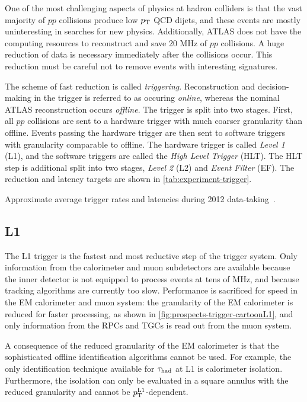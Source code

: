 One of the most challenging aspects of physics at hadron colliders is that the vast majority of $pp$ collisions produce low $p_{\mathrm{T}}$ QCD dijets, and these events are mostly uninteresting in searches for new physics. Additionally, ATLAS does not have the computing resources to reconstruct and save 20 MHz of $pp$ collisions. A huge reduction of data is necessary immediately after the collisions occur. This reduction must be careful not to remove events with interesting signatures.

The scheme of fast reduction is called \textit{triggering}. Reconstruction and decision-making in the trigger is referred to as occuring \textit{online}, whereas the nominal ATLAS reconstruction occurs \textit{offline}. The trigger is split into two stages. First, all $pp$ collisions are sent to a hardware trigger with much coarser granularity than offline. Events passing the hardware trigger are then sent to software triggers with granularity comparable to offline. The hardware trigger is called \textit{Level 1} (L1), and the software triggers are called the \textit{High Level Trigger} (HLT). The HLT step is additional split into two stages, \textit{Level 2} (L2) and \textit{Event Filter} (EF). The reduction and latency targets are shown in \cref{tab:experiment-trigger}.

\begin{table}[bp]
  \centering
  \renewcommand{\arraystretch}{1.4}
  \caption{Approximate average trigger rates and latencies during 2012 data-taking~\cite{cern-jinst-atlas,TRIG-2012-03,TriggerOperationPublicResults}.}
  
  \label{tab:experiment-trigger}
\end{table}

\subsection{L1}

The L1 trigger is the fastest and most reductive step of the trigger system. Only information from the calorimeter and muon subdetectors are available because the inner detector is not equipped to process events at tens of MHz, and because tracking algorithms are currently too slow. Performance is sacrificed for speed in the EM calorimeter and muon system: the granularity of the EM calorimeter is reduced for faster processing, as shown in \cref{fig:prospects-trigger-cartoonL1}, and only information from the RPCs and TGCs is read out from the muon system.

A consequence of the reduced granularity of the EM calorimeter is that the sophisticated offline identification algorithms cannot be used. For example, the only identification technique available for $\tau_\text{had}$ at L1 is calorimeter isolation. Furthermore, the isolation can only be evaluated in a square annulus with the reduced granularity and cannot be $p_{\mathrm{T}}^\text{L1}$-dependent.

